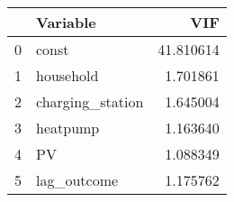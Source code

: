 \begin{tabular}{llr}
\toprule
 & Variable & VIF \\
\midrule
0 & const & 41.810614 \\
1 & household & 1.701861 \\
2 & charging_station & 1.645004 \\
3 & heatpump & 1.163640 \\
4 & PV & 1.088349 \\
5 & lag_outcome & 1.175762 \\
\bottomrule
\end{tabular}
